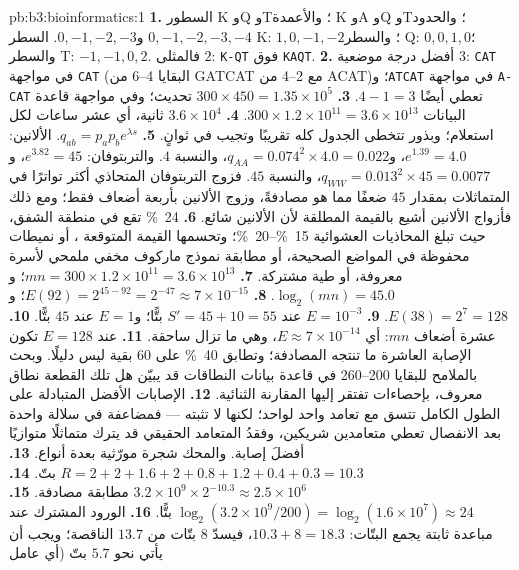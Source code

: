 \begin{solution}{pb:b3:bioinformatics:1}
\textbf{1.} السطور K وQ وT؛ والأعمدة K وA وQ وT؛ والحدود $0,-1,-2,-3,-4$
و$0,-1,-2,-3$. السطر K: $1, 0, -1, -2$؛ والسطر Q: $0, 0, 1, 0$؛ والسطر T:
$-1, -1, 0, 2$. فالمثلى $2$: \texttt{K-QT} فوق \texttt{KAQT}.
\textbf{2.} أفضل درجة موضعية $3$: \texttt{CAT} في مواجهة \texttt{CAT}
(البقايا 4--6 من GATCAT مع 2--4 من ACAT)؛ و\texttt{ATCAT} في مواجهة
\texttt{A-CAT} تعطي أيضًا $4 - 1 = 3$.
\textbf{3.} $300\times 450 = 1.35\times 10^{5}$ تحديث؛ وفي مواجهة
قاعدة البيانات $300\times 1.2\times 10^{11} = 3.6\times 10^{13}$.
\textbf{4.} $3.6\times 10^{4}$ ثانية، أي عشر ساعات لكل استعلام؛ وبذور 
تتخطى الجدول كله تقريبًا وتجيب في ثوانٍ.
\textbf{5.} $q_{ab} = p_{a}p_{b}e^{\lambda s}$. الألانين: $e^{1.39} = 4.0$،
و$q_{AA} = 0.074^{2}\times 4.0 = 0.022$، والنسبة $4$. والتربتوفان:
$e^{3.82} = 45$، و$q_{WW} = 0.013^{2}\times 45 = 0.0077$، والنسبة $45$. فزوج
التربتوفان المتحاذي أكثر تواترًا في المتماثلات بمقدار $45$ ضعفًا مما هو
مصادفةً، وزوج الألانين بأربعة أضعاف فقط؛ ومع ذلك فأزواج الألانين
أشيع بالقيمة المطلقة لأن الألانين شائع.
\textbf{6.} \qty{24}{\%} تقع في منطقة الشفق، حيث تبلغ المحاذيات
العشوائية \qtyrange{15}{20}{\%}؛ وتحسمها القيمة المتوقعة ،
أو نميطات محفوظة في المواضع الصحيحة، أو مطابقة نموذج ماركوف مخفي ملمحي لأسرة
معروفة، أو طية مشتركة.
\textbf{7.} $mn = 300\times 1.2\times 10^{11} = 3.6\times 10^{13}$؛
و$\log_{2}(mn) = 45.0$.
\textbf{8.} $E(92) = 2^{45 - 92} = 2^{-47} \approx 7\times 10^{-15}$؛
و$E(38) = 2^{7} = 128$.
\textbf{9.} $E = 10^{-3}$ عند $S' = 45 + 10 = 55$ بتًّا؛ و$E = 1$ عند $45$
بتًّا.
\textbf{10.} عشرة أضعاف $mn$: أي $E \approx 7\times 10^{-14}$، وهي ما تزال
ساحقة.
\textbf{11.} عند $E = 128$ تكون الإصابة العاشرة ما تنتجه المصادفة؛
وتطابق \qty{40}{\%} على $60$ بقية ليس دليلًا. وبحث بالملامح
للبقايا 200--260 في قاعدة بيانات النطاقات قد يبيّن هل
تلك القطعة نطاق معروف، بإحصاءات تفتقر إليها المقارنة
الثنائية.
\textbf{12.} الإصابات الأفضل المتبادلة على الطول الكامل تتسق
مع تعامد واحد لواحد؛ لكنها لا تثبته --- فمضاعفة في
سلالة واحدة بعد الانفصال تعطي متعامدين شريكين، وفقدُ
المتعامد الحقيقي قد يترك متماثلًا متوازيًا أفضلَ إصابة. والمحك شجرة مورّثية بعدة
أنواع.
\textbf{13.} $R = 2 + 2 + 1.6 + 2 + 0.8 + 1.2 + 0.4 + 0.3 = 10.3$ بتّ.
\textbf{14.} $3.2\times 10^{9}\times 2^{-10.3} \approx 2.5\times 10^{6}$
مطابقة مصادفة.
\textbf{15.} $\log_{2}(3.2\times 10^{9}/200) = \log_{2}(1.6\times 10^{7})
\approx 24$ بتًّا.
\textbf{16.} الورود المشترك عند مباعدة ثابتة يجمع البتّات: $10.3 + 8 =
18.3$، فيسدّ $8$ بتّات من $13.7$ الناقصة؛ ويجب أن يأتي نحو $5.7$ بتّ (أي عامل

\end{solution}
